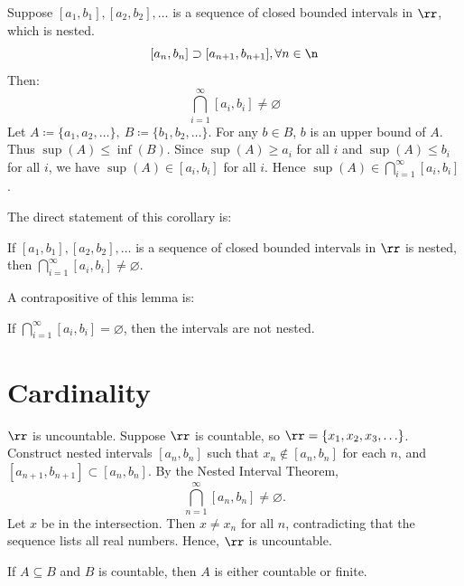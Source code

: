 \begin{theorem}{
    Suppose $[a_1,b_1], [a_2,b_2],\ldots$ is a sequence of closed bounded intervals in $\rr$, which is nested.
    \[
        [a_n,b_n]\supset [a_{n+1},b_{n+1}], \forall n\in\n
    \]
    Then:
    \[
        \bigcap\limits_{i=1}^{\infty} [a_i,b_i] \neq \varnothing
    \]
}
    Let $A\coloneqq \{a_1,a_2,\ldots\},\ B\coloneqq \{b_1,b_2,\ldots\}$.
    For any $b\in B$, $b$ is an upper bound of $A$.
    Thus $\sup(A)\leq\inf(B)$.
    Since $\sup(A)\geq a_i$ for all $i$ and $\sup(A)\leq b_i$ for all $i$, we have $\sup(A)\in[a_i,b_i]$ for all $i$.
    Hence $\sup(A)\in \bigcap_{i=1}^\infty [a_i,b_i]$.
\end{theorem}

\begin{remark}
    The direct statement of this corollary is:
    \begin{displayquote}
        If $[a_1,b_1], [a_2,b_2],\ldots$ is a sequence of closed bounded intervals in $\rr$ is nested, then $\bigcap_{i=1}^{\infty} [a_i,b_i]\neq\varnothing$.
    \end{displayquote}
    A contrapositive of this lemma is:
    \begin{displayquote}
        If $\bigcap_{i=1}^{\infty} [a_i,b_i] = \varnothing$, then the intervals are not nested.
    \end{displayquote}
\end{remark}

\section{Cardinality}

\begin{theorem}{
    $\rr$ is uncountable.
}
    Suppose $\rr$ is countable, so $\rr=\{x_1,x_2,x_3,\ldots\}$.
    Construct nested intervals $[a_n,b_n]$ such that $x_n\notin[a_n,b_n]$ for each $n$, and $[a_{n+1},b_{n+1}]\subset[a_n,b_n]$.
    By the Nested Interval Theorem,
    \[
        \bigcap_{n=1}^\infty [a_n,b_n]\neq \varnothing.
    \]
    Let $x$ be in the intersection.
    Then $x\neq x_n$ for all $n$, contradicting that the sequence lists all real numbers.
    Hence, $\rr$ is uncountable.
\end{theorem}

\begin{theorem*}{
    If $A\subseteq B$ and $B$ is countable, then $A$ is either countable or finite.
}
\end{theorem*}

